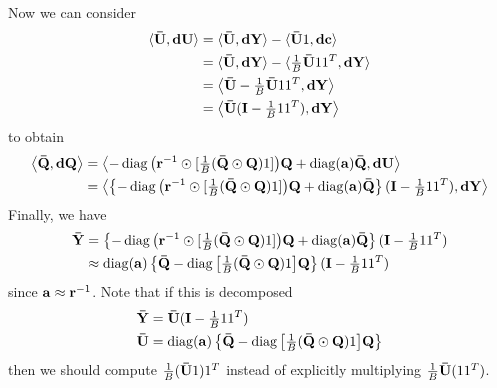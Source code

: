 Now we can consider
\begin{align}
\langle \gradobj{U}, \obj{dU} \rangle
& = \langle \gradobj{U}, \obj{dY} \rangle - \langle \gradobj{U} 1, \obj{dc} \rangle \\
& = \langle \gradobj{U}, \obj{dY} \rangle - \langle \tfrac{1}{B} \gradobj{U} 1 1^{T} , \obj{dY} \rangle \\
& = \left\langle \gradobj{U} - \tfrac{1}{B} \gradobj{U} 1 1^{T} , \obj{dY} \right\rangle \\
& = \left\langle \gradobj{U} (\obj{I} - \tfrac{1}{B} 1 1^{T}) , \obj{dY} \right\rangle
\end{align}
to obtain
\begin{align}
\left\langle \gradobj{Q}, \obj{dQ} \right\rangle
& = \left\langle -\diag\big( \obj{r}^{-1} \odot [\tfrac{1}{B} (\gradobj{Q} \odot \obj{Q}) 1] \big) \obj{Q} + \diag(\obj{a}) \gradobj{Q}, \obj{dU} \right\rangle \\
& = \left\langle \left\{ -\diag\big( \obj{r}^{-1} \odot [\tfrac{1}{B} (\gradobj{Q} \odot \obj{Q}) 1] \big) \obj{Q} + \diag(\obj{a}) \gradobj{Q} \right\} (\obj{I} - \tfrac{1}{B} 1 1^{T}) , \obj{dY} \right\rangle
\end{align}
Finally, we have
\begin{align}
\gradobj{Y} & = \left\{ -\diag\big( \obj{r}^{-1} \odot [\tfrac{1}{B} (\gradobj{Q} \odot \obj{Q}) 1] \big) \obj{Q} + \diag(\obj{a}) \gradobj{Q} \right\} (\obj{I} - \tfrac{1}{B} 1 1^{T}) \\
& \approx \diag(\obj{a}) \left\{ \gradobj{Q} - \diag\big[ \tfrac{1}{B} (\gradobj{Q} \odot \obj{Q}) 1 \big] \obj{Q} \right\} (\obj{I} - \tfrac{1}{B} 1 1^{T})
\end{align}
since $\obj{a} \approx \obj{r}^{-1}$.
Note that if this is decomposed
\begin{align}
\gradobj{Y} & = \gradobj{U} (\obj{I} - \tfrac{1}{B} 1 1^{T}) \\
\gradobj{U} & = \diag(\obj{a}) \left\{ \gradobj{Q} - \diag\big[ \tfrac{1}{B} (\gradobj{Q} \odot \obj{Q}) 1 \big] \obj{Q} \right\}
\end{align}
then we should compute $\frac{1}{B} (\gradobj{U} 1) 1^{T}$ instead of explicitly multiplying $\frac{1}{B} \gradobj{U} (1 1^{T})$.


